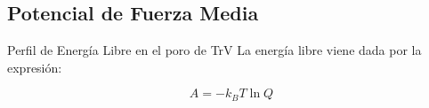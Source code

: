 \documentclass[8pt]{beamer}
\begin{document}
\subsection{Potencial de Fuerza Media}
\begin{frame}[t]{Perfil de Energía Libre en el poro de TrV}
La energía libre viene dada por la expresión:\\
\begin{minipage}{0.4\textwidth}
\begin{equation*}
A = - k_B T \ln Q
\end{equation*}
\end{minipage}
\vspace{0.2cm}


\end{frame}
\end{document}
